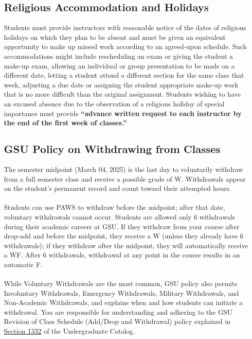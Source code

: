 \documentclass[a4paper, 12pt]{article}
\begin{document}
\subsection{Religious Accommodation and Holidays}
Students must provide instructors with reasonable notice of the dates of religious holidays on which they plan to be absent and must be given an equivalent opportunity to make up missed work according to an agreed-upon schedule. Such accommodations might include rescheduling an exam or giving the student a make-up exam, allowing an individual or group presentation to be made on a different date, letting a student attend a different section for the same class that week, adjusting a due date or assigning the student appropriate make-up work that is no more difficult than the original assignment. Students wishing to have an excused absence due to the observation of a religious holiday of special importance must provide \textbf{“advance written request to each instructor by the end of the first week of classes.”}

\subsection{GSU Policy on Withdrawing from Classes}
The semester midpoint (March 04, 2025) is the last day to voluntarily withdraw from a full semester class and receive a possible grade of W.  Withdrawals appear on the student’s permanent record and count toward their attempted hours.  
\\
\\
Students can use PAWS to withdraw before the midpoint; after that date, voluntary withdrawals cannot occur.  Students are allowed only 6 withdrawals during their academic careers at GSU. If they withdraw from your course after drop-add and before the midpoint, they receive a W (unless they already have 6 withdrawals); if they withdraw after the midpoint, they will automatically receive a WF.   After 6 withdrawals, withdrawal at any point in the course results in an automatic F. 
\\
\\
While Voluntary Withdrawals are the most common, GSU policy also permits Involuntary Withdrawals, Emergency Withdrawals, Military Withdrawals, and Non-Academic Withdrawals, and explains when and how students can initiate a withdrawal.   You are responsible for understanding and adhering to the GSU Revision of Class Schedule (Add/Drop and Withdrawal) policy explained in \href{https://catalogs.gsu.edu/content.php?catoid=13&navoid=1563}{Section 1332} of the Undergraduate Catalog.  
\end{document}
